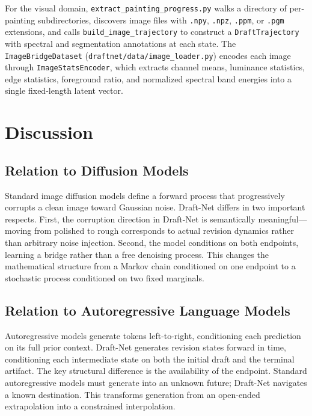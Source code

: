 \documentclass[12pt,a4paper]{article}
\theoremstyle{draftthm}
\newcommand{\code}[1]{\texttt{\small #1}}
\begin{document}
For the visual domain, \code{extract\_painting\_progress.py} walks a directory of per-painting subdirectories, discovers image files with \code{.npy}, \code{.npz}, \code{.ppm}, or \code{.pgm} extensions, and calls \code{build\_image\_trajectory} to construct a \code{DraftTrajectory} with spectral and segmentation annotations at each state. The \code{ImageBridgeDataset} (\code{draftnet/data/image\_loader.py}) encodes each image through \code{ImageStatsEncoder}, which extracts channel means, luminance statistics, edge statistics, foreground ratio, and normalized spectral band energies into a single fixed-length latent vector.

\section{Discussion}

\subsection{Relation to Diffusion Models}

Standard image diffusion models define a forward process that progressively corrupts a clean image toward Gaussian noise. Draft-Net differs in two important respects. First, the corruption direction in Draft-Net is semantically meaningful---moving from polished to rough corresponds to actual revision dynamics rather than arbitrary noise injection. Second, the model conditions on both endpoints, learning a bridge rather than a free denoising process. This changes the mathematical structure from a Markov chain conditioned on one endpoint to a stochastic process conditioned on two fixed marginals.

\subsection{Relation to Autoregressive Language Models}

Autoregressive models generate tokens left-to-right, conditioning each prediction on its full prior context. Draft-Net generates revision states forward in time, conditioning each intermediate state on both the initial draft and the terminal artifact. The key structural difference is the availability of the endpoint. Standard autoregressive models must generate into an unknown future; Draft-Net navigates a known destination. This transforms generation from an open-ended extrapolation into a constrained interpolation.
\end{document}
